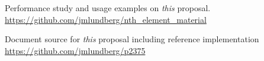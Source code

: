 \begin{thebibliography}{9}
Performance study and usage examples on \emph{this} proposal.\\
\url{https://github.com/jmlundberg/nth_element_material}

Document source for \emph{this} proposal including reference implementation\\
\url{https://github.com/jmlundberg/p2375}

\end{thebibliography}
\let\addcontentsline\oldaddcontentsline%


